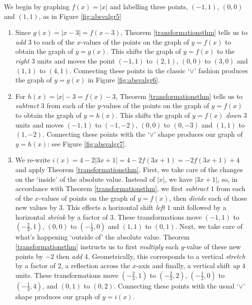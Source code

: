 {
We begin by graphing $f(x) = |x|$ and labelling three points, $(-1,1)$, $(0,0)$ and $(1,1)$, as in Figure \ref{fig:absvalgr5}


\begin{enumerate}

\item Since $g(x) = |x-3| = f(x-3)$, Theorem \ref{transformationsthm} tells us to \textit{add} $3$ to each of the $x$-values of the points on the graph of $y=f(x)$ to obtain the graph of $y=g(x)$.   This shifts the graph of $y=f(x)$ to the \textit{right} $3$ units and moves the point $(-1,1)$ to $(2,1)$,  $(0,0)$ to $(3,0)$ and $(1,1)$ to $(4,1)$.  Connecting these points in the classic `$\vee$' fashion produces the graph of $y = g(x)$ in Figure \ref{fig:absvalgr6}.


\item For $h(x) = |x| - 3 = f(x) -3$, Theorem \ref{transformationsthm} tells us to \textit{subtract} $3$ from each of the $y$-values of the points on the graph of $y=f(x)$ to obtain the graph of $y = h(x)$.  This shifts the graph of $y=f(x)$ \textit{down} $3$ units and moves $(-1,1)$ to $(-1,-2)$, $(0,0)$ to $(0,-3)$ and $(1,1)$ to $(1,-2)$.  Connecting these points with the `$\vee$' shape produces our graph of $y=h(x)$: see Figure \ref{fig:absvalgr7}.


\item We re-write $i(x) = 4-2|3x+1| =  4-2f(3x+1) = -2f(3x+1) + 4$  and apply Theorem \ref{transformationsthm}.  First, we take care of the changes on the `inside' of the absolute value.  Instead of $|x|$, we have $|3x+1|$, so, in accordance with Theorem \ref{transformationsthm}, we first \textit{subtract} $1$ from each of the $x$-values of points on the graph of $y = f(x)$,  then \textit{divide} each of those new values by $3$.  This effects a horizontal shift \textit{left} $1$ unit followed by a horizontal \textit{shrink} by a factor of $3$.  These transformations move $(-1,1)$ to $\left(-\frac{2}{3}, 1 \right)$, $(0,0)$ to $\left(-\frac{1}{3}, 0 \right)$ and $(1,1)$ to $\left(0,1\right)$.  Next, we take care of what's happening `outside of' the absolute value.   Theorem \ref{transformationsthm} instructs us to first \textit{multiply} each $y$-value of these new points by $-2$ then \textit{add} $4$.  Geometrically, this corresponds to a vertical \textit{stretch} by a factor of $2$, a reflection across the $x$-axis and finally, a vertical shift \textit{up} $4$ units.  These transformations move $\left(-\frac{2}{3}, 1 \right)$ to $\left(-\frac{2}{3}, 2 \right)$, $\left(-\frac{1}{3}, 0 \right)$ to $\left(-\frac{1}{3}, 4 \right)$, and $\left(0,1\right)$ to $\left(0, 2\right)$.  Connecting these points with the usual `$\vee$' shape produces our graph of $y = i(x)$.


\end{enumerate}}
